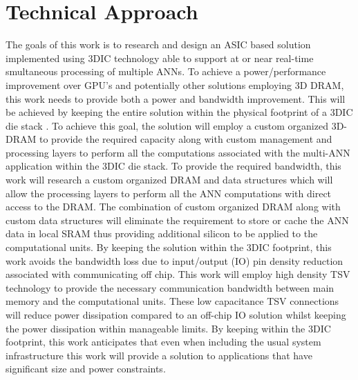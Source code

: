 

\section{Technical Approach}
\label{chap-four}

The goals of this work is to research and design an ASIC based solution implemented using 3DIC technology able to support at or near real-time smultaneous 
processing of multiple ANNs. 
To achieve a power/performance improvement over GPU's and potentially other solutions employing 3D DRAM, this work
needs to provide both a power and bandwidth improvement. 
This will be achieved by keeping the entire solution within the physical footprint of a 3DIC die stack \cite{tsai2008design}.
To achieve this goal, the solution will employ a custom organized 3D-DRAM to provide the required capacity along with custom management and processing
layers to perform all the computations associated with the multi-ANN application within the 3DIC die stack.
To provide the required bandwidth, this work will research a custom organized DRAM and data structures which will allow the processing layers
to perform all the ANN computations with direct access to the DRAM.
The combination of custom organized DRAM along with custom data structures will eliminate the requirement to store or cache the ANN data in 
local SRAM thus providing additional silicon to be applied to the computational units.
By keeping the solution within the 3DIC footprint, this work avoids the bandwidth loss due to input/output (IO) pin density reduction
associated with communicating off chip.
This work will employ high density TSV technology to provide the necessary communication bandwidth between main memory and the computational units.
These low capacitance TSV connections will reduce power dissipation compared to an off-chip IO solution whilst keeping the power dissipation within 
manageable limits.
By keeping within the 3DIC footprint, this work anticipates that even when including the usual system infrastructure this work will provide
a solution to applications that have significant size and power constraints.

